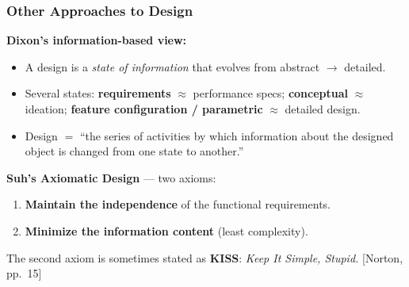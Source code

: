 \documentclass[10pt,aspectratio=43]{beamer}
\newcommand{\pref}[1]{\vfill\hfill{\scriptsize\color{gray}[Norton, pp.~#1]}}
\begin{document}

\begin{frame}
\frametitle{Other Approaches to Design}

\textbf{Dixon's information-based view:}
\begin{itemize}
  \item A design is a \emph{state of information} that evolves from abstract $\to$ detailed.
  \item Several states: \textbf{requirements} $\approx$ performance specs; \textbf{conceptual} $\approx$ ideation; \textbf{feature configuration / parametric} $\approx$ detailed design.
  \item Design $=$ ``the series of activities by which information about the designed object is changed from one state to another.''
\end{itemize}

\vspace{6pt}
\textbf{Suh's Axiomatic Design} --- two axioms:
\begin{yellowbox}
\begin{enumerate}
  \item \textbf{Maintain the independence} of the functional requirements.
  \item \textbf{Minimize the information content} (least complexity).
\end{enumerate}
\end{yellowbox}

\vspace{4pt}
The second axiom is sometimes stated as \textbf{KISS}: \emph{Keep It Simple, Stupid.}
\pref{15}
\end{frame}

\end{document}

